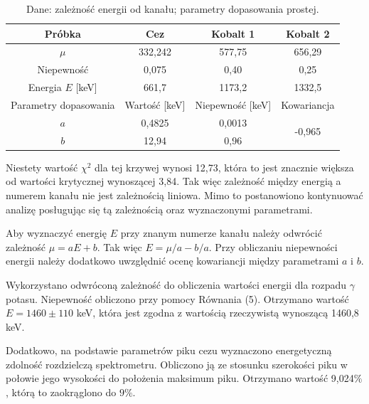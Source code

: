 \documentclass[10pt,a4paper]{article}
\begin{document}
\begin{table}[h!]
\centering
\caption{Dane: zależność energii od kanału; parametry dopasowania prostej.}
\label{my-label}
\begin{tabular}{|c|c|c|c|}
\hline
Próbka                & Cez           & Kobalt 1         & Kobalt 2                \\ \hline
$\mu$                 & 332,242       & 577,75           & 656,29                  \\ \hline
Niepewność            & 0,075         & 0,40             & 0,25                    \\ \hline
Energia $E$ [keV]         & 661,7         & 1173,2           & 1332,5                  \\ \hline
Parametry dopasowania & Wartość [keV] & Niepewność [keV] & Kowariancja             \\ \hline
$a $                    & 0,4825        & 0,0013           & \multirow{2}{*}{-0,965} \\ \cline{1-3}
$b$                     & 12,94         & 0,96             &                         \\ \hline
\end{tabular}
\end{table}
Niestety wartość $\chi^2$ dla tej krzywej wynosi 12,73, która to jest znacznie większa od wartości krytycznej wynoszącej 3,84. Tak więc zależność między energią a numerem kanału nie jest zależnością liniowa. Mimo to postanowiono kontynuować analizę posługując się tą zależnością oraz wyznaczonymi parametrami.

Aby wyznaczyć energię $E$ przy znanym numerze kanału należy odwrócić zależność $\mu=aE+b$.  Tak więc $E=\mu/a -b/a$. Przy obliczaniu niepewności energii należy dodatkowo uwzględnić ocenę kowariancji między parametrami $a$ i $b$.

Wykorzystano odwróconą zależność do obliczenia wartości energii dla rozpadu $\gamma$ potasu. Niepewność obliczono przy pomocy Równania (5). Otrzymano wartość $E=1460\pm110$ keV, która jest zgodna z wartością rzeczywistą wynoszącą 1460,8 keV. 

Dodatkowo, na podstawie parametrów piku cezu wyznaczono energetyczną zdolność rozdzielczą spektrometru. Obliczono ją ze stosunku szerokości piku w połowie jego wysokości do położenia maksimum piku. Otrzymano wartość 9,024$\%$, którą to zaokrąglono do $9\%$.
\end{document}
